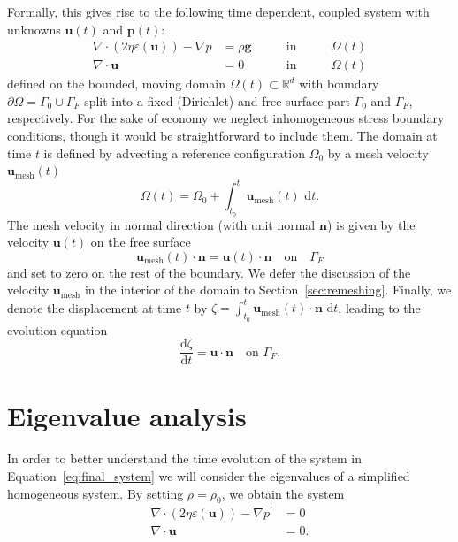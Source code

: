 \documentclass[preprint,12pt,authoryear]{elsarticle}
\begin{document}
Formally, this gives rise to the following time dependent, coupled system with unknowns $\mathbf{u}(t)$ and $\mathbf{p}(t)$:
\begin{equation}
\begin{aligned}
\nabla \cdot \left( 2 \eta \varepsilon( \mathbf{u} ) \right) - \nabla p &= \rho \mathbf{g} \qquad &\text{in} \qquad &\Omega(t)\\
\nabla \cdot \mathbf{u} &= 0  \qquad &\text{in} \qquad &\Omega(t)
\end{aligned}
\label{eq:final_system}
\end{equation}
defined on the bounded, moving domain $\Omega(t)\subset \mathbb{R}^d$ with boundary $\partial \Omega = \Gamma_0 \cup \Gamma_F$
split into a fixed (Dirichlet) and free surface part $\Gamma_0$ and $\Gamma_F$, respectively.
For the sake of economy we neglect inhomogeneous stress boundary conditions, though it would be straightforward to include them.
The domain at time $t$ is defined by advecting a reference configuration $\Omega_0$ by a mesh velocity $\mathbf{u}_{\mathrm{mesh}}(t)$
\begin{equation}
 \Omega(t) = \Omega_0 + \int_{t_0}^t \mathbf{u}_{\mathrm{mesh}}(t) \text{ d}t.
\end{equation}
The mesh velocity in normal direction (with unit normal $\mathbf{n}$) is given by the velocity $\mathbf{u}(t)$ on the free surface
\begin{equation}
 \mathbf{u}_\mathrm{mesh}(t) \cdot \mathbf{n} = \mathbf{u}(t) \cdot \mathbf{n} \quad \text{on} \quad \Gamma_F
\end{equation}
and set to zero on the rest of the boundary. We defer the discussion of the velocity $\mathbf{u}_\mathrm{mesh}$ in the interior of the domain
to Section~\ref{sec:remeshing}.
Finally, we denote the displacement at time $t$ by $\zeta = \int_{t_0}^t \mathbf{u}_\mathrm{mesh}(t)\cdot \mathbf{n} \text{ d}t$, leading to the evolution
equation
\begin{equation}
\frac{\text{d} \zeta}{\text{d}t} = \mathbf{u \cdot \mathbf{n}} \quad \textrm{on  }  \Gamma_F.
\label{eq:surface_evolution}
\end{equation}



\section{Eigenvalue analysis}
\label{sec:eigenvalue}

In order to better understand the time evolution of the system in Equation~\eqref{eq:final_system}
we will consider the eigenvalues of a simplified homogeneous system. By setting $\rho = \rho_0$, we obtain the system
\begin{equation}
\begin{aligned}
\nabla \cdot \left( 2 \eta \varepsilon( \mathbf{u} ) \right) - \nabla p^\prime &= 0 \\
\nabla \cdot \mathbf{u} &= 0.
\end{aligned}
\label{eq:homogeneous_stokes}
\end{equation}
\end{document}
